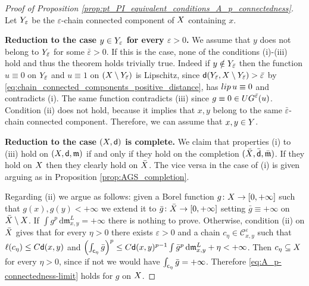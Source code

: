 \documentclass[12pt]{amsart}
\newcommand{\sfd}{{\sf d}}
\renewcommand{\d}{{\mathrm d}}
\newcommand{\X}{{\rm X}}
\newcommand{\Y}{{\rm Y}}
\newcommand{\lip}{{\rm lip}}
\newcommand{\mm}{\mathfrak m}
\theoremstyle{definition}
\newcommand{\sfc}{{\sf c}}
\newcommand{\Chain}[1]{\mathscr{C}^{#1}}
\newcommand{\UG}[1]{{\rm UG}^{#1}}
\begin{document}
\begin{proof}[Proof of Proposition \ref{prop:pt_PI_equivalent_conditions_A_p_connectedness}]
    Let $\Y_\varepsilon$ be the $\varepsilon$-chain connected component of $\X$ containing $x$.
    
    \textbf{Reduction to the case $y \in \Y_\varepsilon$ for every $\varepsilon > 0$.} We assume that $y$ does not belong to $\Y_{\bar{\varepsilon}}$ for some $\bar{\varepsilon} > 0$. If this is the case, none of the conditions (i)-(iii) hold and thus the theorem holds trivially true. Indeed if $y\notin \Y_{\bar{\varepsilon}}$ then the function $u \equiv 0$ on $\Y_{\bar{\varepsilon}}$ and $u\equiv 1$ on $(X\setminus \Y_{\bar{\varepsilon}})$ is Lipschitz, since $\sfd(\Y_{\bar{\varepsilon}}, \X \setminus \Y_{\bar{\varepsilon}}) > \bar{\varepsilon}$ by \eqref{eq:chain_connected_components_positive_distance}, has $\lip\,u \equiv 0$ and contradicts (i). The same function contradicts (iii) since $g\equiv 0 \in \UG{\bar{\varepsilon}}(u)$.
    Condition (ii) does not hold, because it implies that $x,y$ belong to the same ${\bar{\varepsilon}}$-chain connected component. Therefore, we can assume that $x,y \in \Y$.

    \textbf{Reduction to the case $(\X,\sfd)$ is complete.} We claim that properties (i) to (iii) hold on $(\X,\sfd,\mm)$ if and only if they hold on the completion $(\bar{\X}, \bar{\sfd}, \bar{\mm})$. If they hold on $\X$ then they clearly hold on $\bar{\X}$. The vice versa in the case of (i) is given arguing as in Proposition \ref{prop:AGS_completion}.
    
    Regarding (ii) we argue as follows: given a Borel function $g\colon \X \to [0,+\infty]$ such that $g(x),g(y) < +\infty$ we extend it to $\bar{g} \colon \bar{\X} \to [0,+\infty]$ setting $\bar{g} \equiv +\infty$ on $\bar{\X} \setminus \X$. If $\int g^p\,\d\mm_{x,y}^L = +\infty$ there is nothing to prove. Otherwise, condition (ii) on $\bar{\X}$ gives that for every $\eta >0$ there exists $\varepsilon > 0$ and a chain $c_\eta \in \Chain{\varepsilon}_{x,y}$ such that $\ell(c_\eta) \le C\sfd(x,y)$ and $\left(\int_{\sfc_\eta} \bar{g} \right)^p \le C\sfd(x,y)^{p-1}\int \bar{g}^p\,\d\mm_{x,y}^L + \eta < +\infty$. Then $c_\eta \subseteq \X$ for every $\eta > 0$, since if not we would have $\int_{\sfc_\eta} \bar{g} = +\infty$. Therefore \eqref{eq:A_p-connectedness-limit} holds for $g$ on $\X$.
    

\end{proof}
\end{document}
